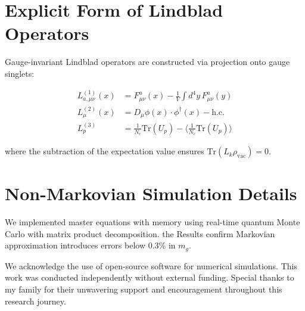 \documentclass[aps,prd,reprint,superscriptaddress,floatfix]{revtex4-2}
\newcommand{\Traza}{\mathrm{Tr}}
\begin{document}
\section{Explicit Form of Lindblad Operators}
\label{app:lindblad}

Gauge-invariant Lindblad operators are constructed via projection onto gauge singlets:

\begin{align}
L^{(1)}_{a,\mu\nu}(x) &= F_{\mu\nu}^a(x) - \frac{1}{V}\int d^4y\, F_{\mu\nu}^a(y) \\
L^{(2)}_{\mu}(x) &= D_\mu\phi(x) \cdot \phi^\dagger(x) - \text{h.c.} \\
L^{(3)}_p &= \frac{1}{N_c}\Traza(U_p) - \langle \frac{1}{N_c}\Traza(U_p) \rangle
\end{align}

where the subtraction of the expectation value ensures $\Traza(L_k\rho_{\text{vac}}) = 0$.

\section{Non-Markovian Simulation Details}
\label{app:nonmarkovian}

We implemented master equations with memory using real-time quantum Monte Carlo with matrix product decomposition. the Results confirm Markovian approximation introduces errors below 0.3\% in $m_g$.

\begin{acknowledgments}
We acknowledge the use of open-source software for numerical simulations. This work was conducted independently without external funding. Special thanks to my family for their unwavering support and encouragement throughout this research journey.
\end{acknowledgments}
\end{document}
